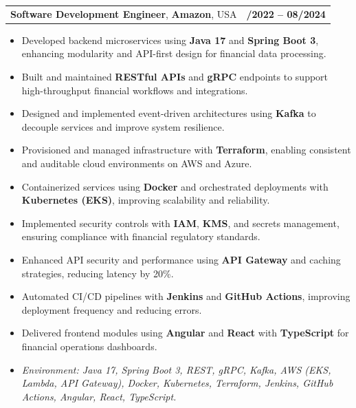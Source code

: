 \documentclass[letterpaper,11pt]{article}
\makeatletter
\newcommand{\resumeItem}[1]{
  \item\footnotesize{
    {#1 \vspace{-2pt}}
  }
}
\newcommand{\resumeSubheading}[4]{
  \vspace{-2pt}\item
    \begin{tabular*}{1.0\textwidth}[t]{l@{\extracolsep{\fill}}r}
      \textbf{\fontsize{10pt}{14pt}\selectfont #3}, \textbf{\fontsize{10pt}{14pt}\selectfont #1}, \fontsize{10pt}{14pt}\selectfont #4 & \textbf{\fontsize{10pt}{14pt}\selectfont #2} \\
    \end{tabular*}\vspace{-7pt}
}
\newcommand{\resumeItemListStart}{\begin{itemize}[leftmargin=*]}
\newcommand{\resumeItemListEnd}{\end{itemize}\vspace{-5pt}}
\makeatother
\begin{document}
\resumeSubheading
{Amazon}{10/2022 -- 08/2024}
{Software Development Engineer}{USA}
\resumeItemListStart
  \resumeItem{Developed backend microservices using \textbf{Java 17} and \textbf{Spring Boot 3}, enhancing modularity and API-first design for financial data processing.}
  \resumeItem{Built and maintained \textbf{RESTful APIs} and \textbf{gRPC} endpoints to support high-throughput financial workflows and integrations.}
  \resumeItem{Designed and implemented event-driven architectures using \textbf{Kafka} to decouple services and improve system resilience.}
  \resumeItem{Provisioned and managed infrastructure with \textbf{Terraform}, enabling consistent and auditable cloud environments on AWS and Azure.}
  \resumeItem{Containerized services using \textbf{Docker} and orchestrated deployments with \textbf{Kubernetes (EKS)}, improving scalability and reliability.}
  \resumeItem{Implemented security controls with \textbf{IAM}, \textbf{KMS}, and secrets management, ensuring compliance with financial regulatory standards.}
  \resumeItem{Enhanced API security and performance using \textbf{API Gateway} and caching strategies, reducing latency by 20\%.}
  \resumeItem{Automated CI/CD pipelines with \textbf{Jenkins} and \textbf{GitHub Actions}, improving deployment frequency and reducing errors.}
  \resumeItem{Delivered frontend modules using \textbf{Angular} and \textbf{React} with \textbf{TypeScript} for financial operations dashboards.}
  \resumeItem{\textit{Environment: Java 17, Spring Boot 3, REST, gRPC, Kafka, AWS (EKS, Lambda, API Gateway), Docker, Kubernetes, Terraform, Jenkins, GitHub Actions, Angular, React, TypeScript.}}
\resumeItemListEnd
\end{document}
